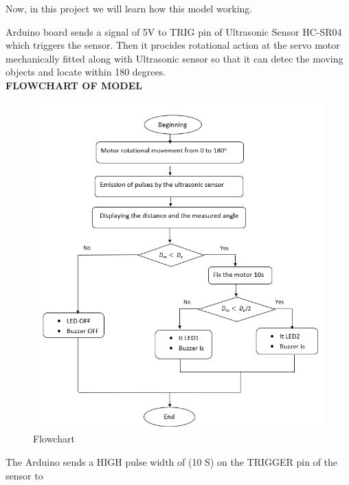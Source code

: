 \documentclass[a4paper]{report}
\begin{document}
                    \vspace{2mm}
                    \par Now, in this project we will learn how this model working. \\
                    \vspace{1mm}
                    \par Arduino board sends a signal of 5V to TRIG pin of Ultrasonic Sensor HC-SR04 
                    which triggers the sensor. Then it procides rotational action at the servo motor mechanically 
                    fitted along with Ultrasonic sensor so that it can detec the moving objects and locate within 
                    180 degrees. \\ 
                    \vspace{3mm}
                    \Large{\textbf{FLOWCHART OF MODEL}}
                    \begin{figure}[H]
                        \centering
                        \includegraphics[width=\linewidth]{flowchart1.png}
                        \caption{\label{fig:pic}Flowchart}
                    \end{figure}
                    The Arduino sends a HIGH pulse width of (10 S) on the TRIGGER pin of the sensor to 
\end{document}
